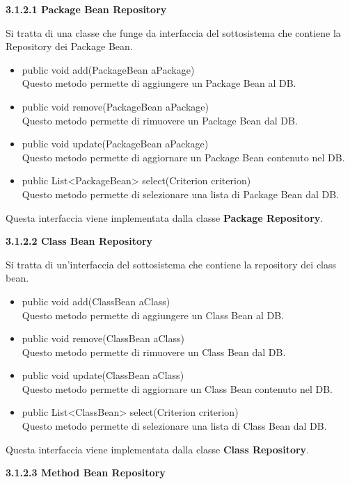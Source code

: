 \documentclass[11pt]{article}
\begin{document}
			\begin{description}
				\item \textbf{3.1.2.1  Package Bean Repository}
				
				Si tratta di una classe che funge da interfaccia del sottosistema che contiene la Repository dei Package Bean.
				
				\begin{itemize}
					\item public void add(PackageBean aPackage)\\
					Questo metodo permette di aggiungere un Package Bean al DB.
					\item public void remove(PackageBean aPackage)\\
					Questo metodo permette di rimuovere un Package Bean dal DB. 
					\item public void update(PackageBean aPackage) \\
					Questo metodo permette di aggiornare un Package Bean contenuto nel DB.
					\item public List<PackageBean> select(Criterion criterion)\\
					Questo metodo permette di selezionare una lista di Package Bean dal DB.
				\end{itemize}
				Questa interfaccia viene implementata dalla classe \textbf{Package Repository}.
				\item \textbf{3.1.2.2  Class Bean Repository}
				
				Si tratta di un'interfaccia del sottosistema che contiene la repository dei class bean.
				
				\begin{itemize}
					\item public void add(ClassBean aClass)\\
					Questo metodo permette di aggiungere un Class Bean al DB.
					\item public void remove(ClassBean aClass)\\
					Questo metodo permette di rimuovere un Class Bean dal DB.  
					\item public void update(ClassBean aClass) \\
					Questo metodo permette di aggiornare un Class Bean contenuto nel DB.
					\item public List<ClassBean> select(Criterion criterion)\\
					Questo metodo permette di selezionare una lista di Class Bean dal DB.
				\end{itemize}
				Questa interfaccia viene implementata dalla classe \textbf{Class Repository}.
				\item \textbf{3.1.2.3  Method Bean Repository}
				

\end{description}
\end{document}
